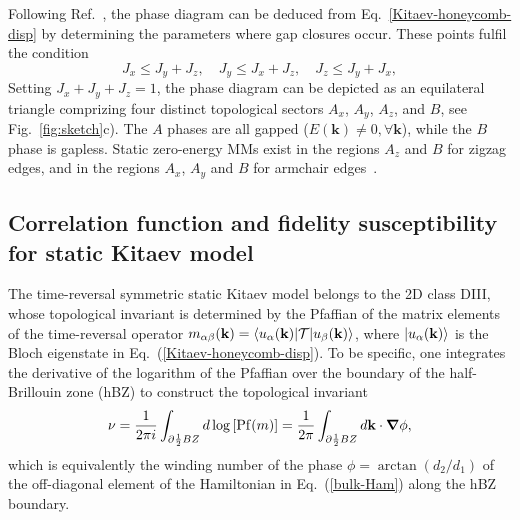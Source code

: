 \documentclass[aps,prb,twocolumn,superscriptaddress,groupedaddress]{revtex4}
\begin{document}
Following Ref.~\cite{Thakurathi:2014}, the phase diagram can be deduced from Eq.~\eqref{Kitaev-honeycomb-disp} by determining the parameters where  gap closures occur. 
These points fulfil the condition
%
\begin{equation}
J_x \le J_y + J_z, \quad J_y \le J_x + J_z, \quad J_z \le J_y + J_x,
\end{equation}
%
Setting $J_x + J_y + J_z = 1$, the phase diagram can be depicted as an equilateral triangle comprizing   four distinct topological sectors  $A_x$, $A_y$, $A_z$, and $B$,  see Fig.~\ref{fig:sketch}c).
The $A$ phases are all gapped ($E(\mathbf{k})\neq 0, \forall \mathbf{k}$), while the $B$ phase is gapless.
Static zero-energy MMs exist in the regions $A_z$ and $B$ for zigzag edges, and in the regions $A_x$, $A_y$ and $B$ for armchair edges~\cite{Thakurathi:2014}. 





\subsection{Correlation function and fidelity susceptibility for static Kitaev model}
\label{sec:static_Majorana_Wannier_fidelity}

The time-reversal symmetric static Kitaev model belongs to the 2D class DIII, whose topological invariant is determined by the Pfaffian of the matrix elements of the time-reversal operator $m_{\alpha\beta}({\bf k})=\langle u_{\alpha}({\bf k})|{\cal T}|u_{\beta}({\bf k})\rangle$, where $|u_{\alpha}({\bf k})\rangle$ is the Bloch eigenstate in Eq.~(\ref{Kitaev-honeycomb-disp}). To be specific, one integrates the derivative of the logarithm of the Pfaffian over the boundary of the half-Brillouin zone (hBZ) to construct the topological invariant 
%
\begin{eqnarray}
\nu=\frac{1}{2\pi i}\int_{\partial\frac{1}{2}BZ}d\log\left[{\rm Pf}(m)\right]=\frac{1}{2\pi}\int_{\partial\frac{1}{2}BZ}d{\bf k}\cdot{\boldsymbol\nabla}\phi,
\label{topo_inv_static_Kitaev}
\end{eqnarray}
%
which is equivalently the winding number of the phase $\phi=\arctan(d_{2}/d_{1})$ of the off-diagonal element of the Hamiltonian in Eq.~(\ref{bulk-Ham}) along the hBZ boundary. 
\end{document}
